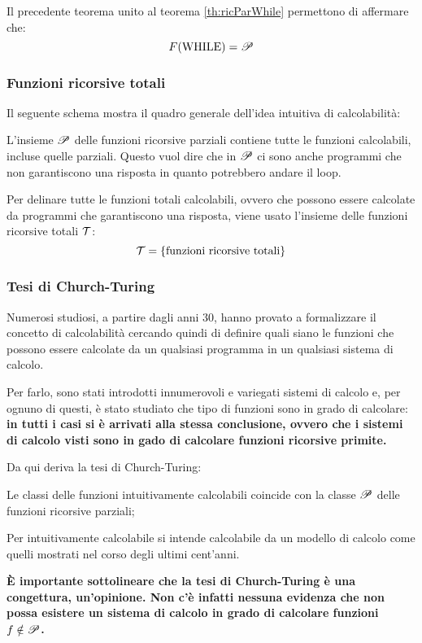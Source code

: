 Il precedente teorema unito al teorema \ref{th:ricParWhile} permettono di affermare che:
$$ F(\text{WHILE}) = \mathscr{P} $$

\subsubsection{Funzioni ricorsive totali}
Il seguente schema mostra il quadro generale dell'idea intuitiva di calcolabilità:
\vspace{1em}
\begin{center}
    
\end{center}

L'insieme $\mathscr{P}$ delle funzioni ricorsive parziali contiene tutte le funzioni
calcolabili, incluse quelle parziali. Questo vuol dire che in $\mathscr{P}$ ci sono anche
programmi che non garantiscono una risposta in quanto potrebbero andare il loop.

Per delinare tutte le funzioni totali calcolabili, ovvero che possono essere calcolate
da programmi che garantiscono una risposta, viene usato l'insieme delle funzioni
ricorsive totali $\mathcal{T}$:
$$\mathcal{T} = \{\text{funzioni ricorsive totali}\} $$
\vspace{.1em}
\begin{center}
    
\end{center}
\vspace{.5em}

\subsubsection{Tesi di Church-Turing}
Numerosi studiosi, a partire dagli anni 30, hanno provato a formalizzare il concetto di
calcolabilità cercando quindi di definire quali siano le funzioni che possono essere
calcolate da un qualsiasi programma in un qualsiasi sistema di calcolo.

Per farlo, sono stati introdotti innumerovoli e variegati sistemi di calcolo e, per
ognuno di questi, è stato studiato che tipo di funzioni sono in grado di calcolare:
\textbf{in tutti i casi si è arrivati alla stessa conclusione, ovvero che i sistemi
di calcolo visti sono in gado di calcolare funzioni ricorsive primite.}

Da qui deriva la tesi di Church-Turing:
\begin{center}
    \begin{minipage}{.9\textwidth}
        \begin{tcolorbox}[colback=white,sharp corners,boxrule=.2mm]
            Le classi delle funzioni intuitivamente calcolabili coincide con la classe 
            $\mathscr{P}$ delle funzioni ricorsive parziali;
        \end{tcolorbox}
    \end{minipage}
\end{center}
Per intuitivamente calcolabile si intende calcolabile da un modello di calcolo
 come quelli mostrati nel corso degli ultimi cent'anni.

\textbf{È importante sottolineare che la tesi di Church-Turing è una congettura, 
un'opinione. Non c'è infatti nessuna evidenza che non possa esistere un sistema di 
calcolo in grado di calcolare funzioni $f\notin\mathscr{P}$.}

